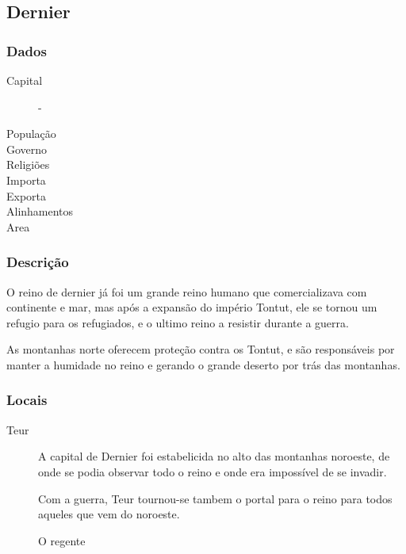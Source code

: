 \subsection{Dernier}
\subsubsection{Dados}
  \begin{description}
   \item[Capital] - 
   \item[Popula\c{c}\~ao]
   \item[Governo]
   \item[Religi\~oes]
   \item[Importa]
   \item[Exporta]
   \item[Alinhamentos]
   \item[Area]
  \end{description}
\subsubsection{Descri\c{c}\~ao}
O reino de dernier j\'a foi um grande reino humano que comercializava
com continente e mar, mas ap\'os a expans\~ao do imp\'erio Tontut,
ele se tornou um refugio para os refugiados, e o ultimo reino
a resistir durante a guerra.

As montanhas norte oferecem prote\c{c}\~ao contra os Tontut,
e s\~ao respons\'aveis por manter a humidade no reino e gerando
o grande deserto por tr\'as das montanhas.
\subsubsection{Locais}
\begin{description}
\item[Teur]
A capital de Dernier foi estabelicida no alto das montanhas
noroeste, de onde se podia observar todo o reino e onde
era imposs\'ivel de se invadir.

Com a guerra, Teur tournou-se tambem o portal para o reino para
todos aqueles que vem do noroeste.

O regente
\end{description}
